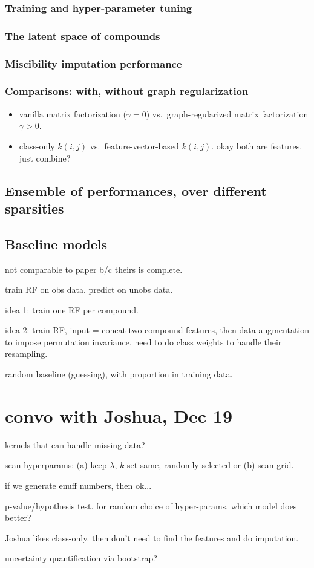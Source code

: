 \documentclass[11pt, oneside]{article}
\begin{document}
\subsubsection{Training and hyper-parameter tuning}

\subsubsection{The latent space of compounds}
\subsubsection{Miscibility imputation performance}

\subsubsection{Comparisons: with, without graph regularization}
  \begin{itemize}
   \item vanilla matrix factorization ($\gamma=0$) vs.\ graph-regularized matrix factorization $\gamma > 0$.
   \item class-only $k(i,j)$ vs.\ feature-vector-based $k(i, j)$. okay both are features. just combine?
  \end{itemize}


\subsection{Ensemble of performances, over different sparsities}

\subsection{Baseline models}

not comparable to paper b/c theirs is complete.

train RF on obs data. predict on unobs data.

idea 1: train one RF per compound. 

idea 2: train RF, input = concat two compound features, then data augmentation to impose permutation invariance. need to do class weights to handle their resampling. 

random baseline (guessing), with proportion in training data.

\section{convo with Joshua, Dec 19}
kernels that can handle missing data?

scan hyperparams: (a) keep $\lambda$, $k$ set same, randomly selected or (b) scan grid.

if we generate enuff numbers, then ok...

p-value/hypothesis test. for random choice of hyper-params. which model does better?

Joshua likes class-only. then don't need to find the features and do imputation. 




uncertainty quantification via bootstrap?



\end{document}
